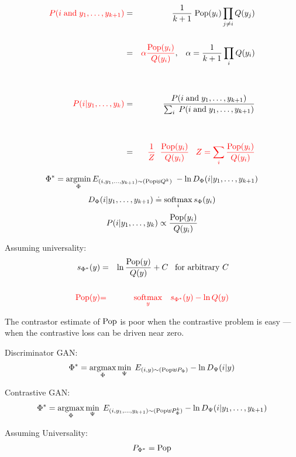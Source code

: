 {
{\huge
\begin{eqnarray*}
{\color{red} P(i \;\mathrm{and}\;y_1,\ldots,y_{k+1})} & = & \frac{1}{k+1}\;\mathrm{Pop}(y_i)\prod_{j \not = i}Q(y_j) \\
\\
& = & {\color{red} \alpha \frac{\mathrm{Pop}(y_i)}{Q(y_i)}},\;\;\;\alpha = \frac{1}{k+1} \prod_i Q(y_i) \\
\\
\\
{\color{red} P(i|y_1,\ldots,y_k)} & = & \frac{P(i\;\mathrm{and}\;y_1,\ldots,y_{k+1})}{\sum_i\; P(i\;\mathrm{and}\;y_1,\ldots,y_{k+1})} \\
\\
\\
& = & {\color{red}  \frac{1}{Z}\;\;\frac{\mathrm{Pop}(y_i)}{Q(y_i)}\;\;\;Z = \sum_i \frac{\mathrm{Pop}(y_i)}{Q(y_i)}}
\end{eqnarray*}
}


{\color{red} $$\Phi^* = \operatorname*{argmin}_\Phi E_{(i,y_1,\ldots,y_{k+1}) \sim (\mathrm{Pop}\uplus Q^k)} \;- \ln D_\Phi(i|y_1,\ldots,y_{k+1})$$}
{\color{red} $$D_\Phi(i|y_1,\ldots,y_{k+1}) \doteq \operatorname*{softmax}_i s_\Phi(y_i)$$}
{\color{red} $$P(i|y_1,\ldots,y_k) \propto \frac{\mathrm{Pop}(y_i)}{Q(y_i)}$$}

Assuming universality:
\begin{eqnarray*}
s_{\Phi^*}(y) & = & \ln \frac{\mathrm{Pop}(y)}{Q(y)} + C \;\;\;\mbox{for arbitrary $C$}\\
\\
{\color{red} \mathrm{Pop}(y)} & {\color{red} =} & {\color{red} \operatorname*{softmax}_y\;\;\; s_{\Phi^*}(y) - \ln Q(y)}
\end{eqnarray*}


The contrastor estimate of $\mathrm{Pop}$ is poor when the contrastive problem is easy --- when the contrastive loss can be driven near zero.


Discriminator GAN:
{\color{red} $$\Phi^* = \operatorname*{argmax}_\Phi \min_\Psi \;E_{(i,y) \sim (\mathrm{Pop} \uplus P_\Phi)} - \ln D_\Psi(i|y)$$}

\vfill
Contrastive GAN:
{\color{red} $$\Phi^* = \operatorname*{argmax}_\Phi \min_\Psi \;E_{(i,y_1,\ldots,y_{k+1}) \sim (\mathrm{Pop} \uplus P_\Phi^k)} - \ln D_\Psi(i|y_1,\ldots,y_{k+1})$$}

\vfill
Assuming Universality:
{\color{red} $$P_{\Phi^*} = \mathrm{Pop}$$}

}
